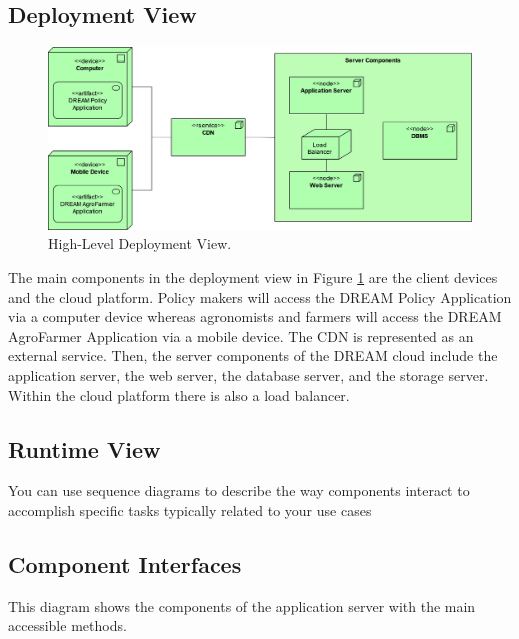 \subsection{Deployment View}
\begin{figure}[hbt!]
\centering
\includegraphics[width=\textwidth]{../images_diagrams/dd/highlevel_deployment.png}
\caption{High-Level Deployment View.}
\label{fig:highLevelDeploy}
\end{figure}

\begin{flushleft}
The main components in the deployment view in Figure \ref{fig:highLevelDeploy} are the client devices and the cloud platform. Policy makers will access the DREAM Policy Application via a computer device whereas agronomists and farmers will access the DREAM AgroFarmer Application via a mobile device. The CDN is represented as an external service. Then, the server components of the DREAM cloud include the application server, the web server, the database server, and the storage server. Within the cloud platform there is also a load balancer.
\end{flushleft}


\subsection{Runtime View}
You can use sequence diagrams to describe the way components interact
to accomplish specific tasks typically related to your use cases
\subsection{Component Interfaces}
This diagram shows the components of the application server with the main accessible methods.

